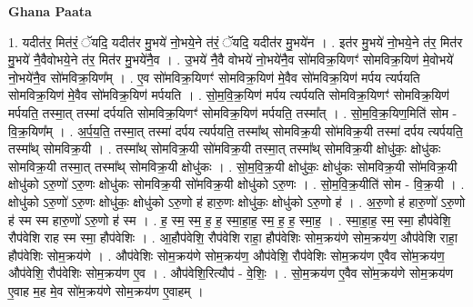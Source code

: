 \documentclass[17pt]{extarticle}
\begin{document}
\textbf{Ghana Paata } \newline

1. यदीत॑र॒ मित॑रं॒ ॅयदि॒ यदीत॑र मु॒भये॑ नो॒भये॒ने त॑रं॒ ॅयदि॒ यदीत॑र मु॒भये॑न । . इत॑र मु॒भये॑ नो॒भये॒ने त॑र॒ मित॑र मु॒भये॑ नै॒वैवोभये॒ने त॑र॒ मित॑र मु॒भये॑नै॒व । . उ॒भये॑ नै॒वै वोभये॑ नो॒भये॑नै॒व सो॑मविक्र॒यिणꣳ॑ सोमविक्र॒यिण॑ मे॒वोभये॑ नो॒भये॑नै॒व सो॑मविक्र॒यिण᳚म् । . ए॒व सो॑मविक्र॒यिणꣳ॑ सोमविक्र॒यिण॑ मे॒वैव सो॑मविक्र॒यिण॑ मर्पय त्यर्पयति सोमविक्र॒यिण॑ मे॒वैव सो॑मविक्र॒यिण॑ मर्पयति । . सो॒म॒वि॒क्र॒यिण॑ मर्पय त्यर्पयति सोमविक्र॒यिणꣳ॑ सोमविक्र॒यिण॑ मर्पयति॒ तस्मा॒त् तस्मा॑ दर्पयति सोमविक्र॒यिणꣳ॑ सोमविक्र॒यिण॑ मर्पयति॒ तस्मा᳚त् । . सो॒म॒वि॒क्र॒यिण॒मिति॑ सोम - वि॒क्र॒यिण᳚म् । . अ॒र्प॒य॒ति॒ तस्मा॒त् तस्मा॑ दर्पय त्यर्पयति॒ तस्मा᳚थ् सोमविक्र॒यी सो॑मविक्र॒यी तस्मा॑ दर्पय त्यर्पयति॒ तस्मा᳚थ् सोमविक्र॒यी । . तस्मा᳚थ् सोमविक्र॒यी सो॑मविक्र॒यी तस्मा॒त् तस्मा᳚थ् सोमविक्र॒यी क्षोधु॑कः॒ क्षोधु॑कः सोमविक्र॒यी तस्मा॒त् तस्मा᳚थ् सोमविक्र॒यी क्षोधु॑कः । . सो॒म॒वि॒क्र॒यी क्षोधु॑कः॒ क्षोधु॑कः सोमविक्र॒यी सो॑मविक्र॒यी क्षोधु॑को ऽरु॒णो॑ ऽरु॒णः क्षोधु॑कः सोमविक्र॒यी सो॑मविक्र॒यी क्षोधु॑को ऽरु॒णः । . सो॒म॒वि॒क्र॒यीति॑ सोम - वि॒क्र॒यी । . क्षोधु॑को ऽरु॒णो॑ ऽरु॒णः क्षोधु॑कः॒ क्षोधु॑को ऽरु॒णो ह॑ हारु॒णः क्षोधु॑कः॒ क्षोधु॑को ऽरु॒णो ह॑ । . अ॒रु॒णो ह॑ हारु॒णो॑ ऽरु॒णो ह॑ स्म स्म हारु॒णो॑ ऽरु॒णो ह॑ स्म । . ह॒ स्म॒ स्म॒ ह॒ ह॒ स्मा॒हा॒ह॒ स्म॒ ह॒ ह॒ स्मा॒ह॒ । . स्मा॒हा॒ह॒ स्म॒ स्मा॒ हौप॑वेशि॒ रौप॑वेशि राह स्म स्मा॒ हौप॑वेशिः । . आ॒हौप॑वेशि॒ रौप॑वेशि राहा॒ हौप॑वेशिः सोम॒क्रय॑णे सोम॒क्रय॑ण॒ औप॑वेशि राहा॒ हौप॑वेशिः सोम॒क्रय॑णे । . औप॑वेशिः सोम॒क्रय॑णे सोम॒क्रय॑ण॒ औप॑वेशि॒ रौप॑वेशिः सोम॒क्रय॑ण ए॒वैव सो॑म॒क्रय॑ण॒ औप॑वेशि॒ रौप॑वेशिः सोम॒क्रय॑ण ए॒व । . औप॑वेशि॒रित्यौप॑ - वे॒शिः॒ । . सो॒म॒क्रय॑ण ए॒वैव सो॑म॒क्रय॑णे सोम॒क्रय॑ण ए॒वाह म॒ह मे॒व सो॑म॒क्रय॑णे सोम॒क्रय॑ण ए॒वाहम् । \newline
\end{document}
